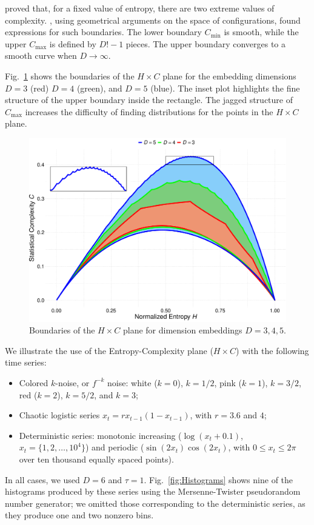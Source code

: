 \documentclass[alpha-refs]{wiley-article}
\begin{document}
\citet{SomeFeaturesoftheLMCStatisticalComplexity} proved that, for a fixed value of entropy, there are two extreme values of complexity.
\citet{martin2006generalized}, using geometrical arguments on the space of configurations, found expressions for such boundaries.
The lower boundary $C_{\min}$ is smooth, while the upper $C_{\max}$ is defined by $D!-1$ pieces.
The upper boundary converges to a smooth curve when $D\to\infty$.


Fig.~\ref{fig:Boundaries} shows the boundaries of the $H\times C$ plane for the embedding dimensions $D=3$ (red) $D=4$ (green), and $D=5$ (blue).
The inset plot highlights the fine structure of the upper boundary inside the rectangle.
The jagged structure of $C_{\max}$ increases the difficulty of finding distributions for the points in the $H\times C$ plane.

\begin{figure}[hbt]
\centering
\includegraphics[width=.7\linewidth]{Figures/BoundariesPlot}
\caption{Boundaries of the $H\times C$ plane for dimension embeddings $D=3,4,5$.}\label{fig:Boundaries}
\end{figure}

We illustrate the use of the Entropy-Complexity plane ($H\times C$) with the following time series:
\begin{itemize}
\item Colored $k$-noise, or $f^{-k}$ noise: white ($k=0$), $k=1/2$, pink ($k=1$), $k=3/2$, red ($k=2$), $k=5/2$, and $k=3$;
\item Chaotic logistic series $x_t = r x_{t-1} (1 - x_{t-1})$, with $r=3.6$ and $4$;
\item Deterministic series: monotonic increasing ($\log(x_t+0.1)$, $x_t=\{1,2,\dots,10^4\}$) and periodic ($\sin(2x_t)\cos(2x_t)$, with $0\leq x_t\leq 2\pi$ over ten thousand equally spaced points).
\end{itemize}
In all cases, we used $D=6$ and $\tau=1$.
Fig.~\ref{fig:Histograms} shows nine of the histograms produced by these series using the Mersenne-Twister pseudorandom number generator;
we omitted those corresponding to the deterministic series, as they produce one and two nonzero bins.
\end{document}
